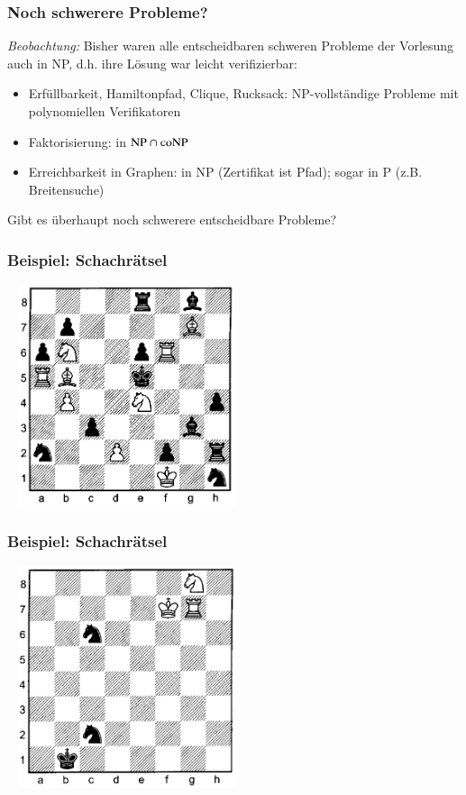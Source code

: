 \documentclass[onlymath]{beamer}
\begin{document}
\begin{frame}\frametitle{Noch schwerere Probleme?}

\emph{Beobachtung:} Bisher waren alle entscheidbaren schweren Probleme der Vorlesung
auch in NP, d.h. ihre Lösung war leicht verifizierbar:

\begin{itemize}
\item \alert{Erfüllbarkeit}, \alert{Hamiltonpfad}, \alert{Clique}, \alert{Rucksack}: NP-vollständige Probleme mit polynomiellen Verifikatoren
\item \alert{Faktorisierung}: in ${\textsc{NP}}\cap{\textsc{coNP}}$
\item \alert{Erreichbarkeit in Graphen}: in NP (Zertifikat ist Pfad); sogar in P (z.B. Breitensuche)
\end{itemize}

Gibt es überhaupt noch schwerere entscheidbare Probleme?

\end{frame}

\begin{frame}\frametitle{Beispiel: Schachrätsel}

~\hfill
\includegraphics[height=6.5cm]{images/mate-3}
\hfill~


\end{frame}

\begin{frame}\frametitle{Beispiel: Schachrätsel}

~\hfill
\includegraphics[height=6.5cm]{images/mate-262}
\hfill~


\end{frame}
\end{document}
